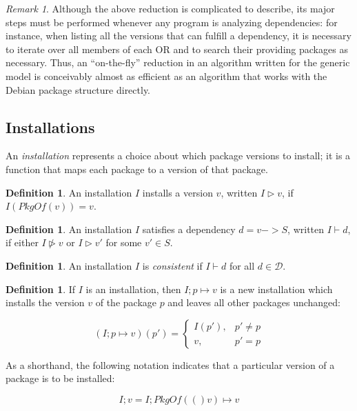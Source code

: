 \documentclass[letterpaper]{article}
\theoremstyle{definition}
\newtheorem{definition}[theorem]{Definition}
\theoremstyle{remark}
\newtheorem*{remark}{Remark}
\newcommand{\D}{\mathcal{D}}
\newcommand{\pkgof}[1]{PkgOf(#1)}
\newcommand{\installs}{\vartriangleright}
\newcommand{\satisfies}{\vdash}
\begin{document}
\begin{remark}
  Although the above reduction is complicated to describe, its major
  steps must be performed whenever any program is analyzing
  dependencies: for instance, when listing all the versions that can
  fulfill a dependency, it is necessary to iterate over all members of
  each OR and to search their providing packages as necessary.  Thus,
  an ``on-the-fly'' reduction in an algorithm written for the generic
  model is conceivably almost as efficient as an algorithm that works
  with the Debian package structure directly.
\end{remark}

\subsection{Installations}

An \emph{installation} represents a choice about which package
versions to install; it is a function that maps each package to a
version of that package.

\begin{definition}
  An installation $I$ installs a version $v$, written $I \installs v$,
  if $I(\pkgof{v})=v$.
\end{definition}

\begin{definition}
  An installation $I$ satisfies a dependency $d=v -> S$, written
  $I \satisfies d$, if either $I \not \installs v$ or $I \installs v'$
  for some $v' \in S$.
\end{definition}

\begin{definition}
  An installation $I$ is \emph{consistent} if $I \satisfies d$ for all
  $d \in \D$.
\end{definition}

\begin{definition}
  If $I$ is an installation, then $I;p \mapsto v$ is a new
  installation which installs the version $v$ of the package $p$ and
  leaves all other packages unchanged:

  \begin{equation}
    (I;p \mapsto v)(p') = \begin{cases}
      I(p'), & p' \neq p \\
      v, & p' = p
    \end{cases}
  \end{equation}

  As a shorthand, the following notation indicates that a particular
  version of a package is to be installed:

  \begin{equation}
    I;v = I;\pkgof(v) \mapsto v
  \end{equation}
\end{definition}
\end{document}
